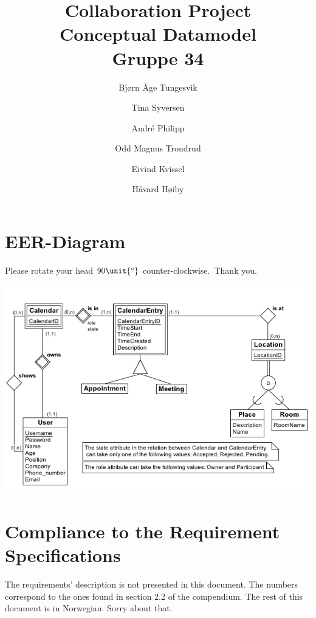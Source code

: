 \documentclass{article}
\begin{document}
\begin{titlepage}
\title{Collaboration Project\\
\textbf{Conceptual Datamodel}\\
Gruppe 34}
\author{Bj\o rn \AA ge Tungesvik\and Tina Syversen\and Andr\'e Philipp\and Odd Magnus Trondrud\and Eivind Kvissel\and H\aa vard H\o iby}
\maketitle
\end{titlepage}

\bigskip

\section{EER-Diagram}

Please rotate your head $90\unit{%
{{}^\circ}%
}$ counter-clockwise.\ Thank you.

\includegraphics[angle=90,scale=0.90]{EER_diagram.png} \newpage

\section{Compliance to the Requirement Specifications}

The requirements' description is not presented in this document. The numbers
correspond to the ones found in section 2.2 of the compendium. The rest of
this document is in Norwegian. Sorry about that.
\end{document}
